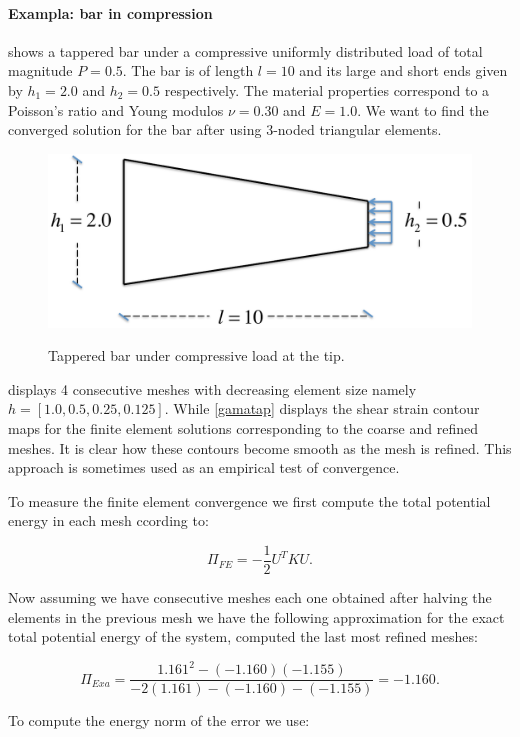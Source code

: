 \paragraph*{Exampla: bar in compression}
 shows a tappered bar under a compressive uniformly distributed load of total magnitude $P=0.5$. The bar is of length $l=10$ and its large and short ends given by $h_1 = 2.0$ and $h_2 =0.5$ respectively. The material properties correspond to a Poisson's ratio and Young modulos $\nu=0.30$ and $E=1.0$. We want to find the converged solution for the bar after using 3-noded triangular elements.



\begin{figure}[H]
\centering
	\includegraphics[width=5.0 in]{img/tappered.pdf}	
	\label{bar}
	\caption{Tappered bar under compressive load at the tip.}
\end{figure}

 displays 4 consecutive meshes with decreasing element size namely $h=[1.0, 0.5, 0.25, 0.125]$. While \cref{gamatap} displays the shear strain contour maps for the finite element solutions corresponding to the coarse and refined meshes. It is clear how these contours become smooth as the mesh is refined. This approach is sometimes used as an empirical test of convergence.

To measure the finite element convergence we first compute the total potential energy in each mesh ccording to:

\[{\Pi _{FE}} =  - \frac{1}{2}{U^T}KU.\]

Now assuming we have consecutive meshes each one obtained after halving the elements in the previous mesh we have the following approximation for the exact total potential energy of the system, computed the last most refined meshes:

\[{\Pi _{Exa}} = \frac{{{{1.161}^2} - ( - 1.160)( - 1.155)}}{{ - 2(1.161) - ( - 1.160) - ( - 1.155)}} = -1.160.\]

To compute the energy norm of the error we use:

